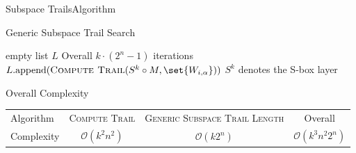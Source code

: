 \begin{frame}{Subspace Trails}{Algorithm}
    \centering
    \begin{block}{Generic Subspace Trail Search}
    \begin{algorithmic}[1]
        \Statex{}
        \State{}empty list $L$
            \Comment Overall $k \cdot (2^n-1)$ iterations
            \State{}$L.\mathrm{append}(\textsc{Compute Trail}(S^k \circ M, \set{W_{i,\alpha}}))$
            \Comment $S^k$ denotes the S-box layer
        \EndFor{}
        \State{}
        \EndFunction{}
    \end{algorithmic}
    \end{block}

    \begin{block}{Overall Complexity}
        \centering
        \begin{tabular}{lccc}
            \toprule
            Algorithm  & \textsc{Compute Trail} & \textsc{Generic Subspace Trail Length} & Overall \\
            Complexity & $\mathcal{O}(k^2 n^2)$ &          $\mathcal{O}(k2^n)$           & $\mathcal{O}(k^3 n^2 2^n)$ \\
            \bottomrule
        \end{tabular}
    \end{block}
\end{frame}

%
%

